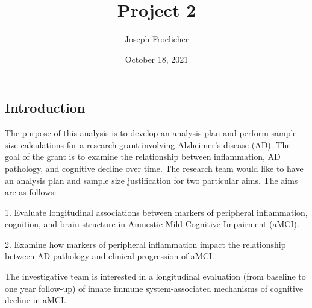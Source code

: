 \documentclass[
]{article}
\title{Project 2}
\author{Joseph Froelicher}
\date{October 18, 2021}
\begin{document}
\maketitle
\begin{doublespace}
\section{Introduction}
The purpose of this analysis is to develop an analysis plan and perform sample size calculations for a research grant involving Alzheimer's disease (AD). The goal of the grant is to examine the relationship between inflammation, AD pathology, and cognitive decline over time. The research team would like to have an analysis plan and sample size justification for two particular aims. The aims are as follows:

1. Evaluate longitudinal associations between markers of peripheral inflammation, cognition, and brain structure in Amnestic Mild Cognitive Impairment (aMCI).

2. Examine how markers of peripheral inflammation impact the relationship between AD pathology and clinical progression of aMCI.

The investigative team is interested in a longitudinal evaluation (from baseline to one year follow-up) of innate immune system-associated mechanisms of cognitive decline in aMCI.

\end{doublespace}
\end{document}
